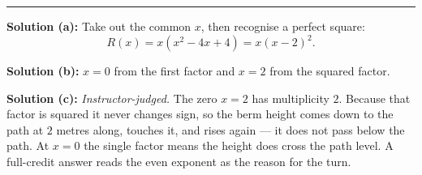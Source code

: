 \documentclass[12pt]{article}
\begin{document}
\vspace{0.25cm}\noindent\rule{\linewidth}{0.2pt}\vspace{0.25cm}


\textbf{Solution (a):} Take out the common $x$, then recognise a perfect square:
\[ R(x) = x\left(x^2 - 4x + 4\right) = x(x-2)^2 . \]

\textbf{Solution (b):} $x = 0$ from the first factor and $x = 2$ from the squared
factor. 

\textbf{Solution (c):} \emph{Instructor-judged.} The zero $x = 2$ has multiplicity
$2$. Because that factor is squared it never changes sign, so the berm height
comes down to the path at $2$ metres along, touches it, and rises again --- it
does not pass below the path. At $x = 0$ the single factor means the height
does cross the path level. A full-credit answer reads the even exponent as the
reason for the turn.
\end{document}
